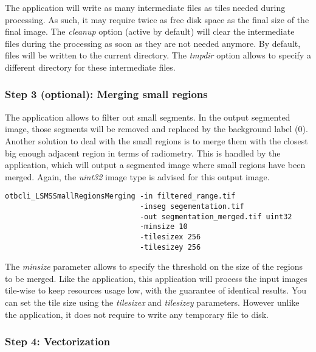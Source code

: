 The  application will write as many
intermediate files as tiles needed during processing. As such, it may
require twice as free disk space as the final size of the final
image. The \emph{cleanup} option (active by default) will clear the
intermediate files during the processing as soon as they are not
needed anymore. By default, files will be written to the current
directory. The \emph{tmpdir} option allows to specify a different
directory for these intermediate files.

\subsubsection{Step 3 (optional): Merging small regions}

The  application allows to filter out
small segments. In the output segmented image, those segments will be
removed and replaced by the background label (0). Another solution to
deal with the small regions is to merge them with the closest big
enough adjacent region in terms of radiometry. This is handled by the
 application, which will output a
segmented image where small regions have been merged. Again, the
\emph{uint32} image type is advised for this output image.

\begin{verbatim}
otbcli_LSMSSmallRegionsMerging -in filtered_range.tif
                               -inseg segementation.tif
                               -out segmentation_merged.tif uint32 
                               -minsize 10 
                               -tilesizex 256 
                               -tilesizey 256
\end{verbatim}

The \emph{minsize} parameter allows to specify the threshold on the
size of the regions to be merged. Like the 
application, this application will process the input images tile-wise
to keep resources usage low, with the guarantee of identical
results. You can set the tile size using the \emph{tilesizex} and
\emph{tilesizey} parameters. However unlike the
 application, it does not require to
write any temporary file to disk.

\subsubsection{Step 4: Vectorization}

